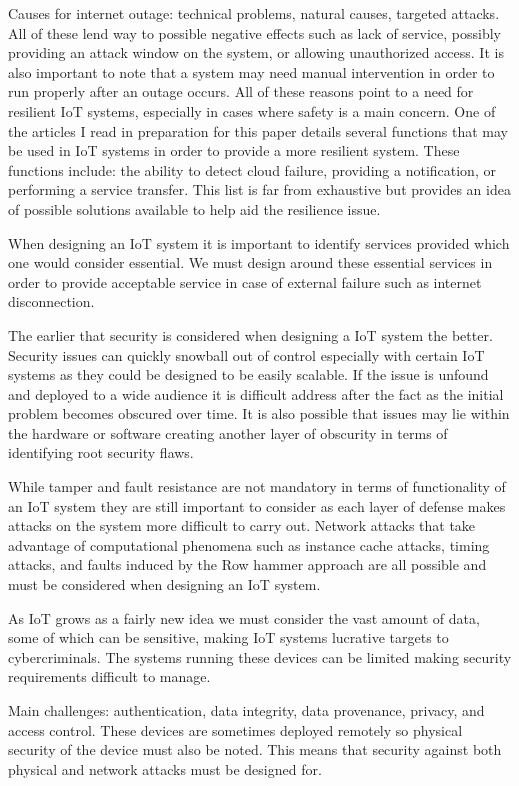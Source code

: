 \documentclass{sig-alternate}
\begin{document}
Causes for internet outage: technical problems, natural causes, targeted attacks. All of these lend way to possible negative effects such as lack of service, possibly providing an attack window on the system, or allowing unauthorized access. It is also important to note that a system may need manual intervention in order to run properly after an outage occurs. All of these reasons point to a need for resilient IoT systems, especially in cases where safety is a main concern. One of the articles I read in preparation for this paper details several functions that may be used in IoT systems in order to provide a more resilient system. These functions include: the ability to detect cloud failure, providing a notification, or performing a service transfer. This list is far from exhaustive but provides an idea of possible solutions available to help aid the resilience issue.

When designing an IoT system it is important to identify services provided which one would consider essential. We must design around these essential services in order to provide acceptable service in case of external failure such as internet disconnection.

The earlier that security is considered when designing a IoT system the better. Security issues can quickly snowball out of control especially with certain IoT systems as they could be designed to be easily scalable. If the issue is unfound and deployed to a wide audience it is difficult address after the fact as the initial problem becomes obscured over time. It is also possible that issues may lie within the hardware or software creating another layer of obscurity in terms of identifying root security flaws.

While tamper and fault resistance are not mandatory in terms of functionality of an IoT system they are still important to consider as each layer of defense makes attacks on the system more difficult to carry out. Network attacks that take advantage of computational phenomena such as instance cache attacks, timing attacks, and faults induced by the Row hammer approach are all possible and must be considered when designing an IoT system.

As IoT grows as a fairly new idea we must consider the vast amount of data, some of which can be sensitive, making IoT systems lucrative targets to cybercriminals. The systems running these devices can be limited making security requirements difficult to manage.

Main challenges: authentication, data integrity, data provenance, privacy, and access control. These devices are sometimes deployed remotely so physical security of the device must also be noted. This means that security against both physical and network attacks must be designed for.
\end{document}
